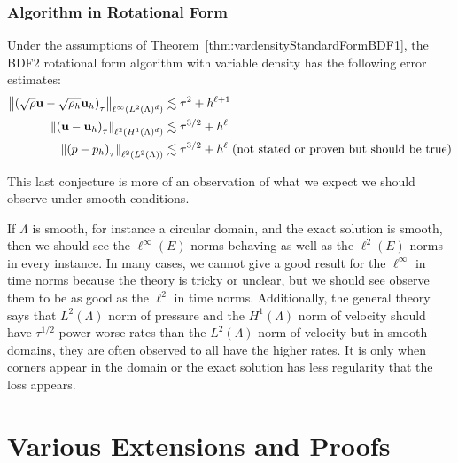 \documentclass[letterpaper]{erdc}
\begin{document}
%
%
\subsection{Algorithm in Rotational Form}

\begin{conjecture}
  Under the assumptions of Theorem~\ref{thm:vardensityStandardFormBDF1}, the BDF2 rotational form algorithm with variable density has the following error estimates:
  \begin{align}
    \left\| \left(\sqrt{\rho} \textbf{u} - \sqrt{\rho_h} \textbf{u}_h \right)_{\tau} \right\|_{\ell^{\infty}(L^2(\Lambda)^d)} &\lesssim \tau^2 + h^{\ell+1}\\
    \left\| \left( \textbf{u} - \textbf{u}_h \right)_{\tau} \right\|_{\ell^2(H^1(\Lambda)^d)} &\lesssim \tau^{3/2} + h^{\ell}\\
    \left\|\left(p - p_h\right)_{\tau} \right\|_{\ell^{2}(L^2(\Lambda))} &\lesssim \tau^{3/2} + h^{\ell}  \mbox{  (not stated or proven but should be true)}
  \end{align}
\end{conjecture}

This last conjecture is more of an observation of what we expect we should observe under smooth conditions.  
\begin{conjecture}
  If $\Lambda$ is smooth, for instance a circular domain, and the exact solution is smooth, then we should see the $\ell^{\infty}(E)$ norms behaving as well as the $\ell^{2}(E)$ norms in every instance.  In many cases, we cannot give a good result for the $\ell^{\infty}$ in time norms because the theory is tricky or unclear, but we should see observe them to be as good as the $\ell^2$ in time norms.  Additionally, the general theory says that $L^{2}(\Lambda)$ norm of pressure and the $H^1(\Lambda)$ norm of velocity should have $\tau^{1/2}$ power worse rates than the $L^2(\Lambda)$ norm of velocity but in smooth domains, they are often observed to all have the higher rates.  It is only when corners appear in the domain or the exact solution has less regularity that the loss appears.  
\end{conjecture}


%
%
%
%
\chapter{Various Extensions and Proofs}

%
%
%
\end{document}
